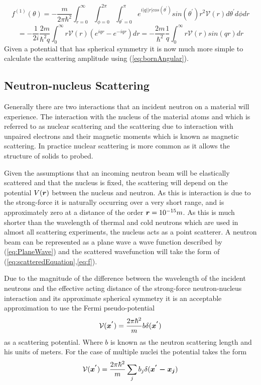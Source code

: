 $$
f^{(1)}(\theta) =  -\frac{m}{2\pi\hbar^2} \int_{r=0}^{\infty} \int_{\phi=0}^{2\pi} \int_{\theta^{'}=0}^{\pi} e^{i \left| q \right| \left| r \right|cos(\theta^{'})}sin(\theta^{'})r^2 \mathcal{V}(r) d\theta^{'} d\phi dr
$$
\begin{equation}
\label{eq:bornAngular}
= -\frac{1}{2i}\frac{2m}{\hbar^2q} \int_{0}^{\infty} r\mathcal{V}(r)(e^{iqr}-e^{-iqr})dr = -\frac{2m}{\hbar^2}\frac{1}{q}\int_{0}^{\infty} r\mathcal{V}(r)sin(qr)dr
\end{equation}
Given a potential that has spherical symmetry it is now much more simple to calculate the scattering amplitude using (\ref{eq:bornAngular}).
\subsection{Neutron-nucleus Scattering}
Generally there are two interactions that an incident neutron on a material will experience. The interaction with the nucleus of the material atoms and which is referred to as nuclear scattering and the scattering due to interaction with unpaired electrons and their magnetic moments which is known as magnetic scattering. In practice nuclear scattering is more common as it allows the structure of solids to probed. 

Given the assumptions that an incoming neutron beam will be elastically scattered and that the nucleus is fixed, the scattering will depend on the potential $V(\mbox{\boldmath$r$})$ between the nucleus and neutron. As this is interaction is due to the strong-force it is naturally occurring over a very short range, and is approximately zero at a distance of the order $\mbox{\boldmath$r$}=10^{-15}m$. As this is much shorter than the wavelength of thermal and cold neutrons which are used in almost all scattering experiments, the nucleus acts as a point scatterer. A neutron beam can be represented as a plane wave a wave function described by (\ref{eq:PlaneWave}) and the scattered wavefunction will take the form of (\ref{eq:scatteredEquation},\ref{eq:f}).

Due to the magnitude of the difference between the wavelength of the incident neutrons and the effective acting distance of the strong-force neutron-nucleus interaction and its approximate spherical symmetry it is an acceptable approximation to use the Fermi pseudo-potential \cite{waveguide}
\begin{equation}
\label{eq:FermiPseudoPotential}
\mathcal{V}(\mbox{\boldmath$x^{'}$}) = \frac{2\pi\hbar^2}{m}b\delta(\mbox{\boldmath$x^{'}$})
\end{equation}
 as a scattering potential. Where $b$ is known as the neutron scattering length and his units of meters. For the case of multiple nuclei the potential takes the form
 \begin{equation}
 \label{eq:MultipleNuclei}
 \mathcal{V}(\mbox{\boldmath$x^{'}$})  = \frac{2\pi\hbar^2}{m}\sum\limits_{j} b_j \delta(\mbox{\boldmath$x^{'}-x_j$})
 \end{equation}

